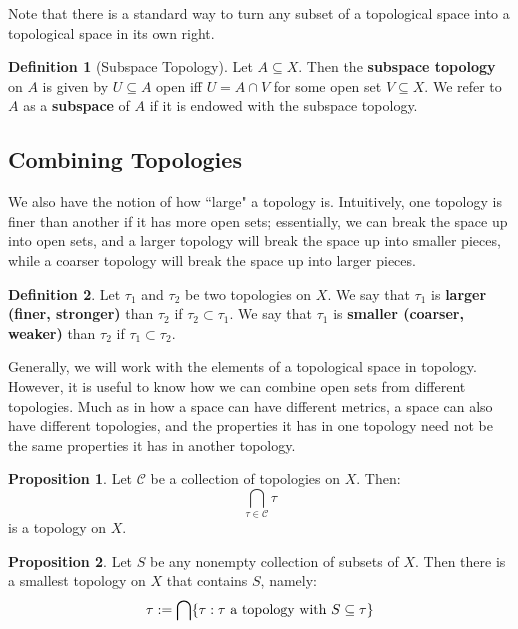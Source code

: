 \documentclass[11pt, oneside]{amsart}   	%
\theoremstyle{definition}
\newtheorem{definition}{Definition}[section]
\newtheorem{prop}{Proposition}[section]
\begin{document}
	Note that there is a standard way to turn any subset of a topological space into a topological space in its own right.
	
	\begin{definition}[Subspace Topology]
		Let $A\subseteq X$. Then the \textbf{subspace topology} on $A$ is given by $U\subseteq A$ open iff $U = A\cap V$ for some open set $V\subseteq X
		$. We refer to $A$ as a \textbf{subspace} of $A$ if it is endowed with the subspace topology.
	\end{definition}
	
	\subsection{Combining Topologies}
	
	We also have the notion of how ``large" a topology is. Intuitively, one topology is finer than another if it has more open sets; essentially, we can break the 
	space up into open sets, and a larger topology will break the space up into smaller pieces, while a coarser topology will break the space up into larger 
	pieces.
	
	\begin{definition}
		Let $\tau_1$ and $\tau_2$ be two topologies on $X$. We say that $\tau_1$ is \textbf{larger (finer, stronger)} than $\tau_2$ if $\tau_2\subset\tau_1$. We say 
		that $\tau_1$ is \textbf{smaller (coarser, weaker)} than $\tau_2$ if $\tau_1\subset\tau_2$.
	\end{definition}
	
	Generally, we will work with the elements of a topological space in topology. However, it is useful to know how we can combine open sets from different 
	topologies. Much as in how a space can have different metrics, a space can also have different topologies, and the properties it has in one topology need 
	not be the same properties it has in another topology.
	
	\begin{prop}
		Let $\mathcal C$ be a collection of topologies on $X$. Then:
		$$
			\bigcap_{\tau\in\mathcal C}\tau
		$$
		is a topology on $X$.
	\end{prop}
	
	\begin{prop}
		Let $S$ be any nonempty collection of subsets of $X$. Then there is a smallest topology on $X$ that contains $S$, namely:
		$$
			\tau := \bigcap\{\tau : \tau\textnormal{ a topology with } S\subseteq\tau\}
		$$
	\end{prop}
	
\end{document}
